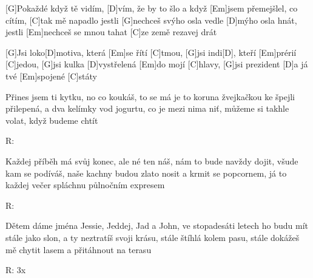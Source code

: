 
[G]Pokaždé když tě vidím, [D]vím, že by to šlo
a když [Em]jsem přemejšlel, co cítím, [C]tak mě napadlo
jestli [G]nechceš svýho osla vedle [D]mýho osla hnát,
jestli [Em]nechceš se mnou tahat [C]ze země rezavej drát

[G]Jsi loko[D]motiva, která [Em]se řítí [C]tmou,
[G]jsi indi[D], kteří [Em]prérií [C]jedou,
[G]jsi kulka [D]vystřelená [Em]do mojí [C]hlavy,
[G]jsi prezident [D]a já tvé [Em]spojené [C]státy

Přines jsem ti kytku, no co koukáš, to se má
je to koruna žvejkačkou ke špejli přilepená,
a dva kelímky vod jogurtu, co je mezi nima niť,
můžeme si takhle volat, když budeme chtít

R:

Každej příběh má svůj konec, ale né ten náš,
nám to bude navždy dojit, všude kam se podíváš,
naše kachny budou zlato nosit a krmit se popcornem,
já to každej večer spláchnu půlnočním expresem

R:

Dětem dáme jména Jessie, Jeddej, Jad a John,
ve stopadesáti letech ho budu mít stále jako slon,
a ty neztratíš svoji krásu, stále štíhlá kolem pasu,
stále dokážeš mě chytit lasem a přitáhnout na terasu

R: 3x



